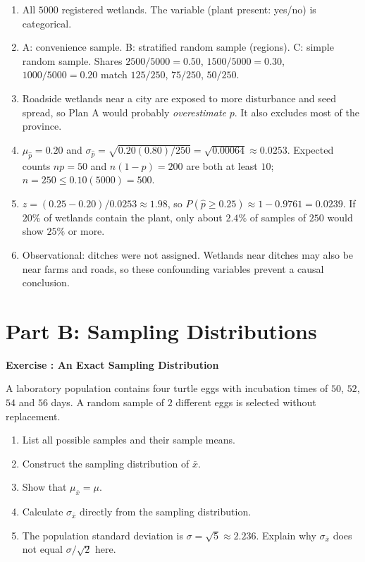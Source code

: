 \documentclass[11pt]{article}
\newcounter{exercise}
\newcommand{\exercise}[1]{%
  \par\medskip
  \refstepcounter{exercise}%
  {\large\bfseries\color{CourseBlue} Exercise \theexercise: #1}\par\smallskip}
\begin{document}
\begin{solution}
\begin{enumerate}
  \item All $5000$ registered wetlands. The variable (plant present: yes/no) is categorical.
  \item A: convenience sample. B: stratified random sample (regions). C: simple random sample. Shares $2500/5000=0.50$, $1500/5000=0.30$, $1000/5000=0.20$ match $125/250$, $75/250$, $50/250$.
  \item Roadside wetlands near a city are exposed to more disturbance and seed spread, so Plan A would probably \emph{overestimate} $p$. It also excludes most of the province.
  \item $\mu_{\hat p}=0.20$ and $\sigma_{\hat p}=\sqrt{0.20(0.80)/250}=\sqrt{0.00064}\approx0.0253$. Expected counts $np=50$ and $n(1-p)=200$ are both at least $10$; $n=250\leq0.10(5000)=500$.
  \item $z=(0.25-0.20)/0.0253\approx1.98$, so $P(\hat p\geq0.25)\approx1-0.9761=0.0239$. If $20\%$ of wetlands contain the plant, only about $2.4\%$ of samples of $250$ would show $25\%$ or more.
  \item Observational: ditches were not assigned. Wetlands near ditches may also be near farms and roads, so these confounding variables prevent a causal conclusion.
\end{enumerate}
\end{solution}

\newpage
\section*{Part B: Sampling Distributions}

\exercise{An Exact Sampling Distribution}

A laboratory population contains four turtle eggs with incubation times of $50$, $52$, $54$ and $56$ days. A random sample of $2$ different eggs is selected without replacement.

\begin{enumerate}
  \item List all possible samples and their sample means.
  \item Construct the sampling distribution of $\bar x$.
  \item Show that $\mu_{\bar x}=\mu$.
  \item Calculate $\sigma_{\bar x}$ directly from the sampling distribution.
  \item The population standard deviation is $\sigma=\sqrt5\approx2.236$. Explain why $\sigma_{\bar x}$ does not equal $\sigma/\sqrt2$ here.
\end{enumerate}
\end{document}
